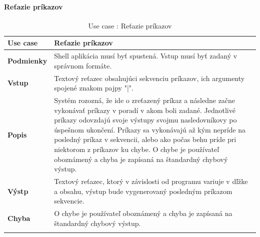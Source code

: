 \paragraph{Reťazie príkazov}
\begin{center}
	\begin{longtable}{|p{2.5cm}|p{14cm}|}

			\hline
			\textbf{Use case} & Reťazie príkazov \\ 
			\hline
			\textbf{Podmienky} & Shell aplikácia musí byť spustená. Vstup musí byť zadaný v správnom formáte.\\ 
			\hline
			\textbf{Vstup} & Textový reťazec obsahujúci sekvenciu príkazov, ich argumenty spojené znakom pajpy "|".\\
			\hline
			\textbf{Popis} & Systém rozozná, že ide o zreťazený príkaz a následne začne vykonávať príkazy v poradí v akom boli zadané. Jednotlivé príkazy odovzdajú svoje výstupy svojmu nasledovníkovy po úspešnom ukončení. Príkazy sa vykonávajú až kým nepríde na posledný príkaz v sekvencii, alebo ako počas behu príde pri niektorom z príkazov ku chybe. O chybe je používateľ oboznámený a chyba je zapísaná na štandardný chybový výstup. \\ 
			\hline

			\textbf{Výstp} & Textový reťazec, ktorý v závislosti od programu variuje v dľžke a obsahu, výstup bude vygenerovaný posledným príkazom sekvencie.\\
			\hline

			\textbf{Chyba} & O chybe je používateľ oboznámený a chyba je zapísaná na štandardný chybový výstup.\\
			\hline
	\caption{Use case : Reťazie príkazov}
	\label{table:1}

	\end{longtable}
\end{center}


